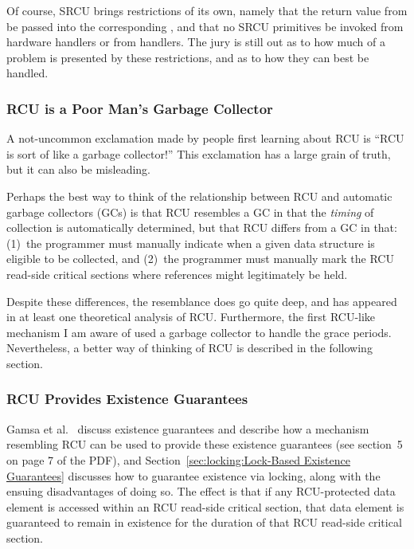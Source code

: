 Of course, SRCU brings restrictions of its own, namely that the
return value from  be passed into the
corresponding , and that no SRCU primitives
be invoked from hardware  handlers or from 
handlers.
The jury is still out as to how much of a problem is presented by
these restrictions, and as to how they can best be handled.

\subsubsection{RCU is a Poor Man's Garbage Collector}
\label{sec:defer:RCU is a Poor Man's Garbage Collector}

A not-uncommon exclamation made by people first learning about
RCU is ``RCU is sort of like a garbage collector!''
This exclamation has a large grain of truth, but it can also be
misleading.

Perhaps the best way to think of the relationship between RCU
and automatic garbage collectors (GCs) is that RCU resembles
a GC in that the \emph{timing} of collection is automatically
determined, but that RCU differs from a GC in that: (1)~the programmer
must manually indicate when a given data structure is eligible
to be collected, and (2)~the programmer must manually mark the
RCU read-side critical sections where references might legitimately
be held.

Despite these differences, the resemblance does go quite deep,
and has appeared in at least one theoretical analysis of RCU.
Furthermore, the first RCU-like mechanism I am aware of used
a garbage collector to handle the grace periods.
Nevertheless, a better way of thinking of RCU is described in the
following section.

\subsubsection{RCU Provides Existence Guarantees}
\label{sec:defer:RCU Provides Existence Guarantees}

Gamsa et al.~\cite{Gamsa99}
discuss existence guarantees and describe how a mechanism
resembling RCU can be used to provide these existence guarantees
(see section~5 on page 7 of the PDF), and
Section~\ref{sec:locking:Lock-Based Existence Guarantees}
discusses how to guarantee existence via locking, along with the
ensuing disadvantages of doing so.
The effect is that if any RCU-protected data element is accessed
within an RCU read-side critical section, that data element is
guaranteed to remain in existence for the duration of that RCU
read-side critical section.

